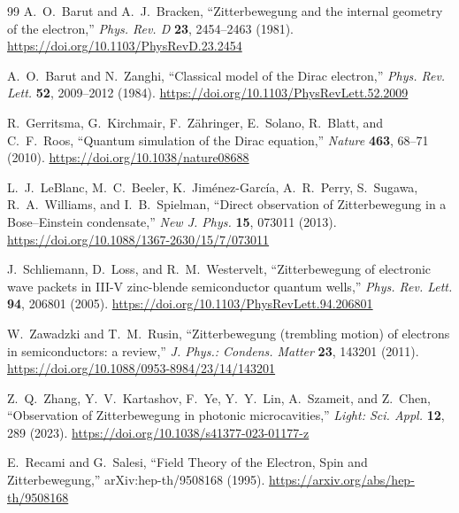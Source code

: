 \documentclass[%
 reprint,
 amsmath,amssymb,
 aps,
]{revtex4-1}
\numberwithin{equation}{section}%
\begin{document}
\begin{thebibliography}{99}
A.~O.~Barut and A.~J.~Bracken, 
``Zitterbewegung and the internal geometry of the electron,'' 
\textit{Phys. Rev. D} \textbf{23}, 2454--2463 (1981). 
\href{https://doi.org/10.1103/PhysRevD.23.2454}{https://doi.org/10.1103/PhysRevD.23.2454}

A.~O.~Barut and N.~Zanghi, 
``Classical model of the Dirac electron,'' 
\textit{Phys. Rev. Lett.} \textbf{52}, 2009--2012 (1984).
\href{https://doi.org/10.1103/PhysRevLett.52.2009}{https://doi.org/10.1103/PhysRevLett.52.2009}

R.~Gerritsma, G.~Kirchmair, F.~Z{\"a}hringer, E.~Solano, R.~Blatt, and C.~F.~Roos, 
``Quantum simulation of the Dirac equation,'' 
\textit{Nature} \textbf{463}, 68--71 (2010). 
\href{https://doi.org/10.1038/nature08688}{https://doi.org/10.1038/nature08688}

L.~J.~LeBlanc, M.~C.~Beeler, K.~Jim{\'e}nez-Garc{\'i}a, A.~R.~Perry, S.~Sugawa, R.~A.~Williams, and I.~B.~Spielman, 
``Direct observation of Zitterbewegung in a Bose–Einstein condensate,'' 
\textit{New J. Phys.} \textbf{15}, 073011 (2013). 
\href{https://doi.org/10.1088/1367-2630/15/7/073011}{https://doi.org/10.1088/1367-2630/15/7/073011}

J.~Schliemann, D.~Loss, and R.~M.~Westervelt, 
``Zitterbewegung of electronic wave packets in III-V zinc-blende semiconductor quantum wells,'' 
\textit{Phys. Rev. Lett.} \textbf{94}, 206801 (2005). 
\href{https://doi.org/10.1103/PhysRevLett.94.206801}{https://doi.org/10.1103/PhysRevLett.94.206801}

W.~Zawadzki and T.~M.~Rusin, 
``Zitterbewegung (trembling motion) of electrons in semiconductors: a review,'' 
\textit{J. Phys.: Condens. Matter} \textbf{23}, 143201 (2011). 
\href{https://doi.org/10.1088/0953-8984/23/14/143201}{https://doi.org/10.1088/0953-8984/23/14/143201}

Z.~Q.~Zhang, Y.~V.~Kartashov, F.~Ye, Y.~Y.~Lin, A.~Szameit, and Z.~Chen, 
``Observation of Zitterbewegung in photonic microcavities,'' 
\textit{Light: Sci. Appl.} \textbf{12}, 289 (2023). 
\href{https://doi.org/10.1038/s41377-023-01177-z}{https://doi.org/10.1038/s41377-023-01177-z}

E.~Recami and G.~Salesi, 
``Field Theory of the Electron, Spin and Zitterbewegung,'' 
arXiv:hep-th/9508168 (1995). 
\href{https://arxiv.org/abs/hep-th/9508168}{https://arxiv.org/abs/hep-th/9508168}


\end{thebibliography}
\end{document}
